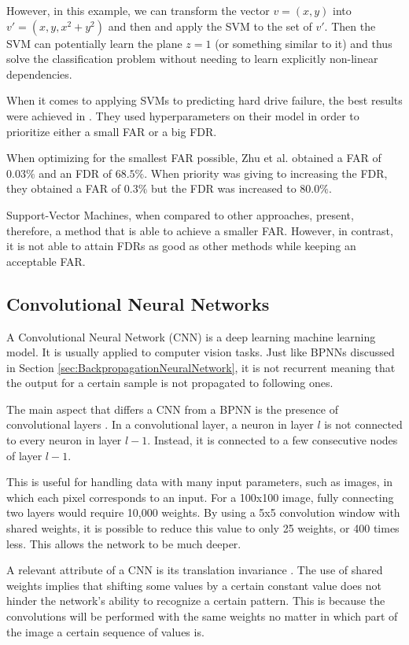 However, in this example, we can transform the vector $v = (x, y)$ into $v' = (x, y, x^2 + y^2)$ and then and apply the SVM to the set of $v'$.
Then the SVM can potentially learn the plane $z = 1$ (or something similar to it) and thus solve the classification problem without needing to learn explicitly non-linear dependencies.

When it comes to applying SVMs to predicting hard drive failure, the best results were achieved in \cite{Zhu13}.
They used hyperparameters on their model in order to prioritize either a small FAR or a big FDR.

When optimizing for the smallest FAR possible, Zhu et al. obtained a FAR of $0.03\%$ and an FDR of $68.5\%$.
When priority was giving to increasing the FDR, they obtained a FAR of $0.3\%$ but the FDR was increased to $80.0\%$.

Support-Vector Machines, when compared to other approaches, present, therefore, a method that is able to achieve a smaller FAR.
However, in contrast, it is not able to attain FDRs as good as other methods while keeping an acceptable FAR.

\subsection{Convolutional Neural Networks}

A Convolutional Neural Network (CNN) is a deep learning machine learning model.
It is usually applied to computer vision tasks.
Just like BPNNs discussed in Section \ref{sec:BackpropagationNeuralNetwork}, it is not recurrent meaning that the output for a certain sample is not propagated to following ones.

The main aspect that differs a CNN from a BPNN is the presence of convolutional layers \cite{o2015introduction}.
In a convolutional layer, a neuron in layer $l$ is not connected to every neuron in layer $l-1$.
Instead, it is connected to a few consecutive nodes of layer $l-1$.

This is useful for handling data with many input parameters, such as images, in which each pixel corresponds to an input.
For a 100x100 image, fully connecting two layers would require 10,000 weights.
By using a 5x5 convolution window with shared weights, it is possible to reduce this value to only 25 weights, or 400 times less.
This allows the network to be much deeper.
 
A relevant attribute of a CNN is its translation invariance \cite{kayhan2020translation}.
The use of shared weights implies that shifting some values by a certain constant value does not hinder the network's ability to recognize a certain pattern.
This is because the convolutions will be performed with the same weights no matter in which part of the image a certain sequence of values is.

